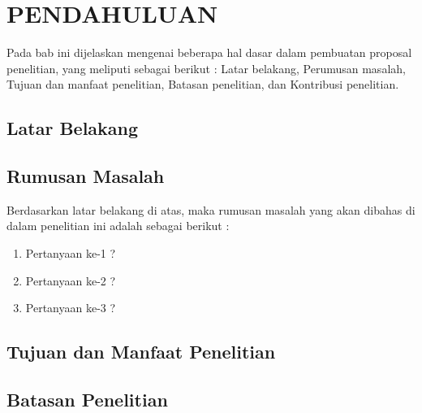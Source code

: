 %
%
%
%
%

\chapter{PENDAHULUAN}

Pada bab ini dijelaskan mengenai beberapa hal dasar dalam pembuatan proposal penelitian, yang meliputi sebagai berikut : Latar belakang, Perumusan masalah, Tujuan dan manfaat penelitian, Batasan penelitian, dan Kontribusi penelitian.

\section{Latar Belakang}

\blindtext \citep{bhati2020review}

\section{Rumusan Masalah}

Berdasarkan latar belakang di atas, maka rumusan masalah yang akan dibahas di dalam penelitian ini adalah sebagai berikut :

\begin{enumerate}
    \item Pertanyaan ke-1 ?
    \item Pertanyaan ke-2 ?
    \item Pertanyaan ke-3 ?
\end{enumerate}

\section{Tujuan dan Manfaat Penelitian}

\blindtext

\section{Batasan Penelitian}

